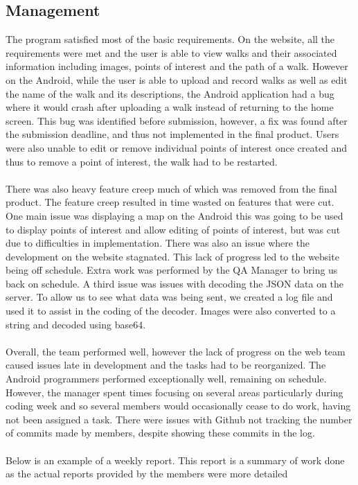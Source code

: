 \documentclass[12pt]{article}
\begin{document}
\subsection{Management}
The program satisfied most of the basic requirements. On the website, all the requirements were met and the user is able to view walks and their associated information including images, points of interest and the path of a walk. However on the Android, while the user is able to upload and record walks as well as edit the name of the walk and its descriptions, the Android application had a bug where it would crash after uploading a walk instead of returning to the home screen. This bug was identified before submission, however, a fix was found after the submission deadline, and thus not implemented in the final product. Users were also unable to edit or remove individual points of interest once created and thus to remove a point of interest, the walk had to be restarted. 
\\\\
There was also heavy feature creep much of which was removed from the final product. The feature creep resulted in time wasted on features that were cut. One main issue was displaying a map on the Android this was going to be used to display points of interest and allow editing of points of interest, but was cut due to difficulties in implementation. There was also an issue where the development on the website stagnated. This lack of progress led to the website being off schedule. Extra work was performed by the QA Manager to bring us back on schedule. A third issue was issues with decoding the JSON data on the server. To allow us to see what data was being sent, we created a log file and used it to assist in the coding of the decoder. Images were also converted to a string and decoded using base64.
\\\\
Overall, the team performed well, however the lack of progress on the web team caused issues late in development and the tasks had to be reorganized. The Android programmers performed exceptionally well, remaining on schedule. However, the manager spent times focusing on several areas particularly during coding week and so several members would occasionally cease to do work, having not been assigned a task. There were issues with Github not tracking the number of commits made by members, despite showing these commits in the log.
\\\\
Below is an example of a weekly report. This report is a summary of work done as the actual reports provided by the members were more detailed
\end{document}
